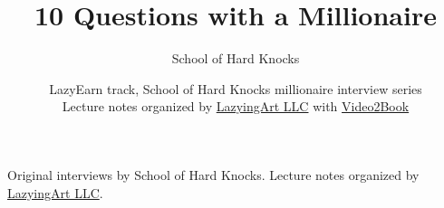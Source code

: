 \documentclass[11pt,oneside]{book}
\begin{document}
\frontmatter


\title{10 Questions with a Millionaire}
\author{School of Hard Knocks}
\date{LazyEarn track, School of Hard Knocks millionaire interview series \\ Lecture notes organized by \href{https://lazying.art}{LazyingArt LLC} with \href{https://github.com/lachlanchen/Video2Book}{Video2Book}}
\maketitle
\begin{center}
\small Original interviews by School of Hard Knocks. Lecture notes organized by \href{https://lazying.art}{LazyingArt LLC}.
\end{center}
\clearpage
\tableofcontents
\mainmatter






















\end{document}
